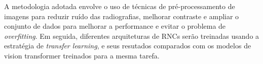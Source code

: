A metodologia adotada envolve o uso de técnicas de pré-processamento de imagens para reduzir ruído das radiografias, melhorar contraste e ampliar o conjunto de dados para melhorar a performance e evitar o problema de \textit{overfitting}. Em seguida, diferentes arquiteturas de RNCs serão treinadas usando a estratégia de \textit{transfer learning}, e seus resutados comparados com os modelos de vision transformer treinados para a mesma tarefa.